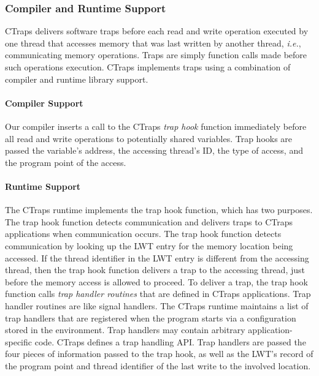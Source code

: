 \documentclass[10pt,nocopyrightspace]{sigplanconf}
\newcommand{\ctraps}{CTraps\xspace}
\newcommand{\lwt}{LWT\xspace}
\newcommand{\Caption}[1]{\begin{minipage}{.95\columnwidth} \caption{#1} \end{minipage} \vspace{-1.2ex}}
\begin{document}
\subsubsection{Compiler and Runtime Support} 

\ctraps delivers software traps before each read and write operation executed
by one thread that accesses memory that was last written by another
thread, {\em i.e.}, communicating memory operations.  Traps are 
simply function calls made before such operations
execution.  \ctraps implements traps using a combination of compiler and
runtime library support.   

\paragraph{Compiler Support} Our compiler inserts a call to the CTraps {\em
trap hook} function immediately before all read and write operations to
potentially shared variables.  Trap hooks are passed the variable's address,
the accessing thread's ID, the type of access, and the program point of the
access.  

\paragraph{Runtime Support}
The \ctraps runtime implements the trap hook function,  which has two purposes.
The trap hook function detects communication and delivers traps to \ctraps
applications when communication occurs.  The trap hook function detects
communication by looking up the \lwt entry for the memory location being
accessed.  If the thread identifier in the \lwt entry is different from the
accessing thread, then the trap hook function delivers a trap to the accessing
thread, just before the memory access is allowed to proceed.  To deliver a
trap, the trap hook function calls {\em trap handler routines} that are defined
in \ctraps applications.  Trap handler routines are like signal handlers.  The
\ctraps runtime maintains a list of trap handlers that are registered when the
program starts via a configuration stored in the environment.  Trap handlers
may contain arbitrary application-specific code.  \ctraps defines a trap
handling API.  Trap handlers are passed the four pieces of information passed
to the trap hook, as well as the \lwt's record of the program point and thread
identifier of the last write to the involved location.

\end{document}
